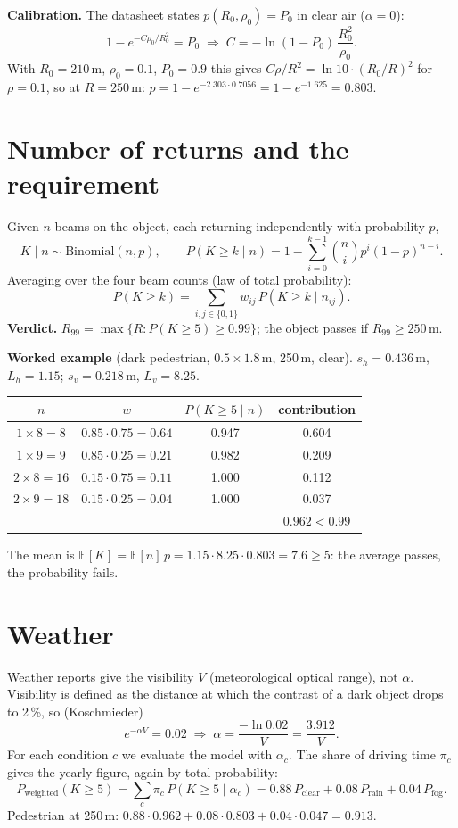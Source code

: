 \documentclass[11pt,a4paper]{article}
\begin{document}
\textbf{Calibration.} The datasheet states $p(R_0,\rho_0) = P_0$ in clear air ($\alpha=0$):
\[
  1 - e^{-C\rho_0/R_0^2} = P_0 \;\Longrightarrow\; C = -\ln(1-P_0)\,\frac{R_0^2}{\rho_0}.
\]
With $R_0 = 210$\,m, $\rho_0 = 0.1$, $P_0 = 0.9$ this gives
$C\rho/R^2 = \ln 10 \cdot (R_0/R)^2$ for $\rho = 0.1$, so at $R=250$\,m:
$p = 1 - e^{-2.303\cdot 0.7056} = 1 - e^{-1.625} = \mathbf{0.803}$.

\section{Number of returns and the requirement}

Given $n$ beams on the object, each returning independently with probability $p$,
\[
  K \mid n \sim \mathrm{Binomial}(n,p), \qquad
  P(K \ge k \mid n) = 1 - \sum_{i=0}^{k-1} \binom{n}{i} p^i (1-p)^{n-i}.
\]
Averaging over the four beam counts (law of total probability):
\[
  P(K \ge k) = \sum_{i,j\in\{0,1\}} w_{ij}\, P(K \ge k \mid n_{ij}).
\]
\textbf{Verdict.} $R_{99} = \max\{R : P(K\ge 5) \ge 0.99\}$; the object passes if $R_{99} \ge 250$\,m.

\textbf{Worked example} (dark pedestrian, $0.5\times1.8$\,m, 250\,m, clear).
$s_h = 0.436$\,m, $L_h = 1.15$; $s_v = 0.218$\,m, $L_v = 8.25$.
\begin{center}
\begin{tabular}{cccc}
  \toprule
  $n$ & $w$ & $P(K\ge5\mid n)$ & contribution \\
  \midrule
  $1\times 8 = 8$  & $0.85\cdot0.75 = 0.64$ & 0.947 & 0.604 \\
  $1\times 9 = 9$  & $0.85\cdot0.25 = 0.21$ & 0.982 & 0.209 \\
  $2\times 8 = 16$ & $0.15\cdot0.75 = 0.11$ & 1.000 & 0.112 \\
  $2\times 9 = 18$ & $0.15\cdot0.25 = 0.04$ & 1.000 & 0.037 \\
  \midrule
  & & & $\mathbf{0.962} < 0.99$ \\
  \bottomrule
\end{tabular}
\end{center}
The mean is $\mathbb{E}[K] = \mathbb{E}[n]\,p = 1.15\cdot 8.25\cdot 0.803 = 7.6 \ge 5$:
the average passes, the probability fails.

\section{Weather}

Weather reports give the visibility $V$ (meteorological optical range), not $\alpha$. Visibility
is defined as the distance at which the contrast of a dark object drops to 2\,\%, so
(Koschmieder)
\[
  e^{-\alpha V} = 0.02 \;\Longrightarrow\; \alpha = \frac{-\ln 0.02}{V} = \frac{3.912}{V}.
\]
For each condition $c$ we evaluate the model with $\alpha_c$. The share of driving time $\pi_c$
gives the yearly figure, again by total probability:
\[
  P_{\text{weighted}}(K\ge5) = \sum_c \pi_c\, P(K\ge5 \mid \alpha_c)
  = 0.88\,P_{\text{clear}} + 0.08\,P_{\text{rain}} + 0.04\,P_{\text{fog}}.
\]
Pedestrian at 250\,m: $0.88\cdot0.962 + 0.08\cdot0.803 + 0.04\cdot0.047 = 0.913$.
\end{document}
